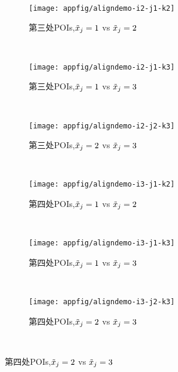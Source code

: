 {{\begin{figure}[!h]
		\\%
		\begin{subfigure}[b]{\trif\textwidth}
			\texttt{[image: appfig/aligndemo-i2-j1-k2]}
			\caption{第三处POIs,$\tilde{x}_j=1$ vs $\tilde{x}_j=2$}
			\label{fig:aligndemo212}
		\end{subfigure}%
		~%
		\begin{subfigure}[b]{\trif\textwidth}
			\texttt{[image: appfig/aligndemo-i2-j1-k3]}
			\caption{第三处POIs,$\tilde{x}_j=1$ vs $\tilde{x}_j=3$}
			\label{fig:aligndemo213}
		\end{subfigure}
		~%
		\begin{subfigure}[b]{\trif\textwidth}
			\texttt{[image: appfig/aligndemo-i2-j2-k3]}
			\caption{第三处POIs,$\tilde{x}_j=2$ vs $\tilde{x}_j=3$}
			\label{fig:aligndemo223}
		\end{subfigure}
		\\%
		\begin{subfigure}[b]{\trif\textwidth}
			\texttt{[image: appfig/aligndemo-i3-j1-k2]}
			\caption{第四处POIs,$\tilde{x}_j=1$ vs $\tilde{x}_j=2$}
			\label{fig:aligndemo312}
		\end{subfigure}%
		~%
		\begin{subfigure}[b]{\trif\textwidth}
			\texttt{[image: appfig/aligndemo-i3-j1-k3]}
			\caption{第四处POIs,$\tilde{x}_j=1$ vs $\tilde{x}_j=3$}
			\label{fig:aligndemo313}
		\end{subfigure}
		~%
		\begin{subfigure}[b]{\trif\textwidth}
			\texttt{[image: appfig/aligndemo-i3-j2-k3]}
			\caption{第四处POIs,$\tilde{x}_j=2$ vs $\tilde{x}_j=3$}
			\label{fig:aligndemo323}
		\end{subfigure}
		\\%
		\label{appfig:aligndemoall}
	\end{figure}

}}
